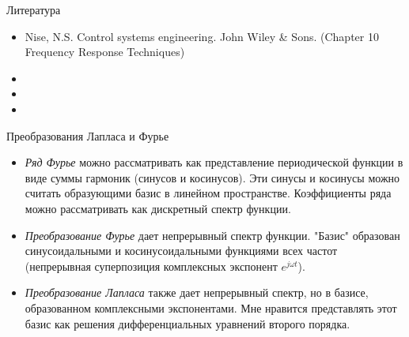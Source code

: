 \documentclass{beamer}
\begin{document}
\begin{frame}{Литература}

\begin{itemize}
	
	
\item Nise, N.S. Control systems engineering. John Wiley \& Sons. (Chapter 10 Frequency Response Techniques)	
	

\item {}	
	
	
\item {}

\item {}


\end{itemize}

\end{frame}




\myqrframe



\begin{frame}{Преобразования Лапласа и Фурье}
	\begin{flushleft}
		
		\begin{itemize}
			\item \emph{Ряд Фурье} можно рассматривать как представление периодической функции в виде суммы гармоник (синусов и косинусов). Эти синусы и косинусы можно считать образующими базис в линейном пространстве. Коэффициенты ряда можно рассматривать как дискретный спектр функции.
			
			\item \emph{Преобразование Фурье} дает непрерывный спектр функции. "Базис" образован синусоидальными и косинусоидальными функциями всех частот (непрерывная суперпозиция комплексных экспонент $e^{j \omega t}$).
			
			\item \emph{Преобразование Лапласа} также дает непрерывный спектр, но в базисе, образованном комплексными экспонентами. Мне нравится представлять этот базис как решения дифференциальных уравнений второго порядка.
		\end{itemize}
		
	\end{flushleft}
\end{frame}
\end{document}
